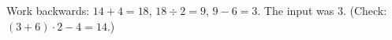 Work backwards: $14+4=18$, $18\div2=9$, $9-6=3$. The input was $\boxed{3}$. (Check: $(3+6)\cdot2-4=14$.)
